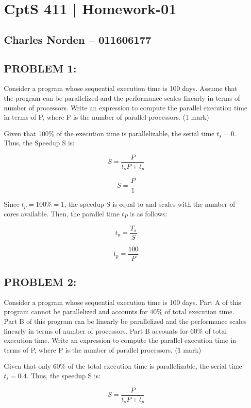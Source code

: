 \documentclass[12pt,letterpaper]{article}
\begin{document}
\section*{CptS 411 | Homework-01 }
\subsection*{Charles Norden -- 011606177 }

\subsection*{PROBLEM 1:}
Consider a program whose sequential execution time is 100 days. Assume that the program can be parallelized and the performance scales linearly in terms of number of processors. Write an expression to compute the parallel execution time in terms of P, where P is the number of parallel processors. (1 mark)

\hline

Given that 100\% of the execution time is parallelizable, the serial time \(t_s = 0\). Thus, the Speedup S is:

\[ S = \frac{P}{t_sP + t_p} \]

\[ S = \frac{P}{1} \]

Since \(t_p = 100\% = 1\), the speedup S is equal to and scales with the number of cores available. Then, the parallel time \(t_{P}\) is as follows:

\[ t_p = \frac{T_s}{S} \]

\[ t_p = \frac{100}{P} \]

\pagebreak


\subsection*{PROBLEM 2:}
Consider a program whose sequential execution time is 100 days. Part A of this program cannot be parallelized and accounts for 40\% of total execution time. Part B of this program can be linearly be parallelized and the performance scales linearly in terms of number of processors. Part B accounts for 60\% of total execution time. Write an expression to compute the parallel execution time in terms of P, where P is the number of parallel processors. (1 mark)

\hline

Given that only 60\% of the total execution time is parallelizable, the serial time \(t_s = 0.4\). Thus, the speedup S is:

\[ S = \frac{P}{t_sP + t_p} \]
\end{document}
